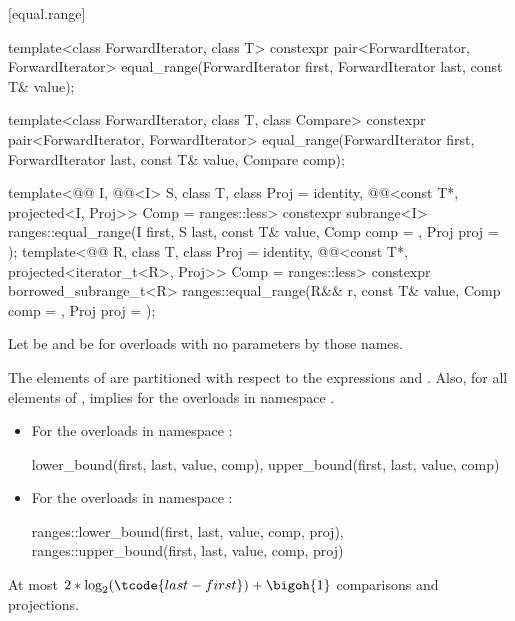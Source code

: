 [equal.range]{}

%
\begin{itemdecl}
template<class ForwardIterator, class T>
  constexpr pair<ForwardIterator, ForwardIterator>
    equal_range(ForwardIterator first,
                ForwardIterator last, const T& value);

template<class ForwardIterator, class T, class Compare>
  constexpr pair<ForwardIterator, ForwardIterator>
    equal_range(ForwardIterator first,
                ForwardIterator last, const T& value,
                Compare comp);

template<@@ I, @@<I> S, class T, class Proj = identity,
         @@<const T*, projected<I, Proj>> Comp = ranges::less>
  constexpr subrange<I>
    ranges::equal_range(I first, S last, const T& value, Comp comp = {}, Proj proj = {});
template<@@ R, class T, class Proj = identity,
         @@<const T*, projected<iterator_t<R>, Proj>> Comp =
           ranges::less>
  constexpr borrowed_subrange_t<R>
    ranges::equal_range(R&& r, const T& value, Comp comp = {}, Proj proj = {});
\end{itemdecl}

\begin{itemdescr}
\pnum
Let  be  and
 be 
for overloads with no parameters by those names.

\pnum
\expects
The elements  of 
are partitioned with respect to the expressions
 and
.
Also, for all elements  of \tcode{[first, last)},
 implies 
for the overloads in namespace .

\pnum
\returns
\begin{itemize}
\item
For the overloads in namespace :
\begin{codeblock}
{lower_bound(first, last, value, comp),
 upper_bound(first, last, value, comp)}
\end{codeblock}
\item
For the overloads in namespace :
\begin{codeblock}
{ranges::lower_bound(first, last, value, comp, proj),
 ranges::upper_bound(first, last, value, comp, proj)}
\end{codeblock}
\end{itemize}

\pnum
\complexity
At most
$2 * \log_2(\tcode{last - first}) + \bigoh{1}$ comparisons and projections.
\end{itemdescr}

